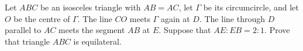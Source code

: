 Let $ABC$ be an isosceles triangle with $AB=AC$, let $\Gamma$ be its circumcircle, and let $O$ be the centre of $\Gamma$. The line $CO$ meets $\Gamma$ again at $D$. The line through $D$ parallel to $AC$ meets the segment $AB$ at $E$. Suppose that $AE:EB=2:1$. Prove that triangle $ABC$ is equilateral.

